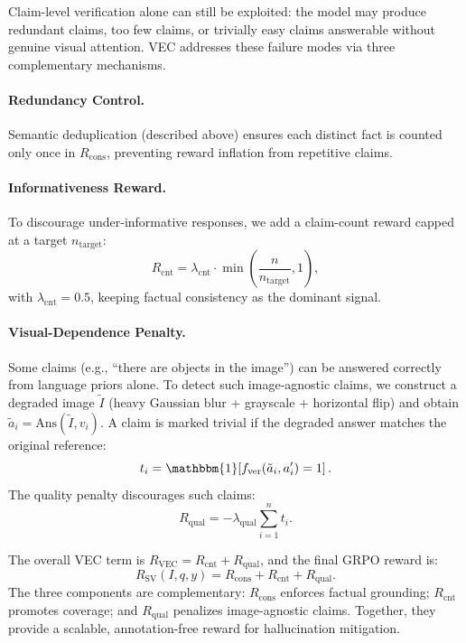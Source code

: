 Claim-level verification alone can still be exploited: the model may produce redundant claims, too few claims, or trivially easy claims answerable without genuine visual attention. VEC addresses these failure modes via three complementary mechanisms.

\paragraph{Redundancy Control.}
Semantic deduplication (described above) ensures each distinct fact is counted only once in $R_{\mathrm{cons}}$, preventing reward inflation from repetitive claims.

\paragraph{Informativeness Reward.}
To discourage under-informative responses, we add a claim-count reward capped at a target $n_{\mathrm{target}}$:
\begin{equation}
    R_{\mathrm{cnt}} = \lambda_{\mathrm{cnt}} \cdot \min\!\left(\frac{n}{n_{\mathrm{target}}}, 1\right),
\end{equation}
with $\lambda_{\mathrm{cnt}} = 0.5$, keeping factual consistency as the dominant signal.

\paragraph{Visual-Dependence Penalty.}
Some claims (e.g., ``there are objects in the image'') can be answered correctly from language priors alone. To detect such image-agnostic claims, we construct a degraded image $\tilde{I}$ (heavy Gaussian blur + grayscale + horizontal flip) and obtain $\tilde{a}_i = \mathrm{Ans}(\tilde{I}, v_i)$. A claim is marked trivial if the degraded answer matches the original reference:
\begin{equation}
    t_i = \mathbbm{1}\!\left[f_{\mathrm{ver}}(\tilde{a}_i, a_i^{\prime}) = 1 \right].
\end{equation}
The quality penalty discourages such claims:
\begin{equation}
    R_{\mathrm{qual}} = -\lambda_{\mathrm{qual}} \sum_{i=1}^{n} t_i.
\end{equation}

The overall VEC term is $R_{\mathrm{VEC}} = R_{\mathrm{cnt}} + R_{\mathrm{qual}}$, and the final GRPO reward is:
\begin{equation}
    R_{\mathrm{SV}}(I,q,y) = R_{\mathrm{cons}} + R_{\mathrm{cnt}} + R_{\mathrm{qual}}.
\end{equation}
The three components are complementary: $R_{\mathrm{cons}}$ enforces factual grounding; $R_{\mathrm{cnt}}$ promotes coverage; and $R_{\mathrm{qual}}$ penalizes image-agnostic claims. Together, they provide a scalable, annotation-free reward for hallucination mitigation.

